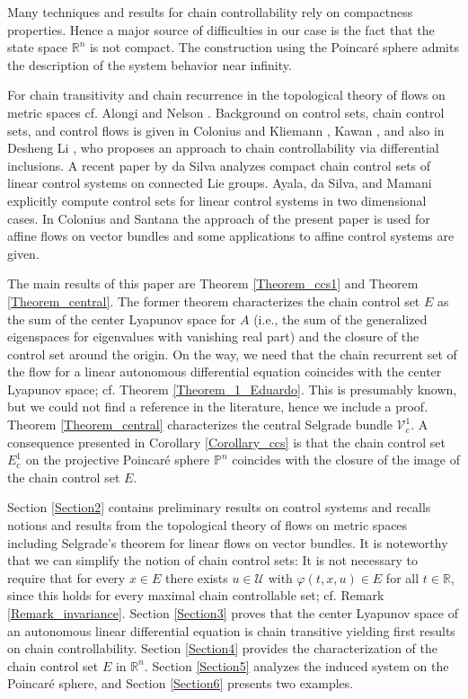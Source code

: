 \documentclass{siamltex}%
\begin{document}
Many techniques and results for chain controllability rely on compactness
properties. Hence a major source of difficulties in our case is the fact that
the state space $\mathbb{R}^{n}$ is not compact. The construction using the
Poincar\'{e} sphere admits the description of the system behavior near infinity.

For chain transitivity and chain recurrence in the topological theory of flows
on metric spaces cf. Alongi and Nelson \cite{AlonN07}. Background on control
sets, chain control sets, and control flows is given in Colonius and Kliemann
\cite{ColK00, ColK14}, Kawan \cite{Kawan13}, and also in Desheng Li
\cite{Li07}, who proposes an approach to chain controllability via
differential inclusions. A recent paper \cite{DaSilva23} by da Silva analyzes
compact chain control sets of linear control systems on connected Lie groups.
Ayala, da Silva, and Mamani \cite{AydSM23} explicitly compute control sets for
linear control systems in two dimensional cases. In Colonius and Santana
\cite{ColS23} the approach of the present paper is used for affine flows on
vector bundles and some applications to affine control systems are given.

The main results of this paper are Theorem \ref{Theorem_ccs1} and Theorem
\ref{Theorem_central}. The former theorem characterizes the chain control set
$E$ as the sum of the center Lyapunov space for $A$ (i.e., the sum of the
generalized eigenspaces for eigenvalues with vanishing real part) and the
closure of the control set around the origin. On the way, we need that the
chain recurrent set of the flow for a linear autonomous differential equation
coincides with the center Lyapunov space; cf. Theorem \ref{Theorem_1_Eduardo}.
This is presumably known, but we could not find a reference in the literature,
hence we include a proof. Theorem \ref{Theorem_central} characterizes the
central Selgrade bundle $\mathcal{V}_{c}^{1}$. A consequence presented in
Corollary \ref{Corollary_ccs} is that the chain control set $E_{c}^{1}$ on the
projective Poincar\'{e} sphere $\mathbb{P}^{n}$ coincides with the closure of
the image of the chain control set $E$.

Section \ref{Section2} contains preliminary results on control systems and
recalls notions and results from the topological theory of flows on metric
spaces including Selgrade's theorem for linear flows on vector bundles. It is
noteworthy that we can simplify the notion of chain control sets: It is not
necessary to require that for every $x\in E$ there exists $u\in\mathcal{U}$
with $\varphi(t,x,u)\in E$ for all $t\in\mathbb{R}$, since this holds for
every maximal chain controllable set; cf. Remark \ref{Remark_invariance}.
Section \ref{Section3} proves that the center Lyapunov space of an autonomous
linear differential equation is chain transitive yielding first results on
chain controllability. Section \ref{Section4} provides the characterization of
the chain control set $E$ in $\mathbb{R}^{n}$. Section \ref{Section5} analyzes
the induced system on the Poincar\'{e} sphere, and Section \ref{Section6}
presents two examples.
\end{document}
